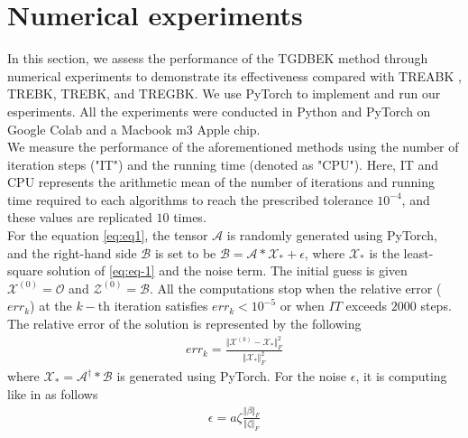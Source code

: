 \documentclass[11pt]{article}
\newtheorem{example}[theorem]{Example}
\def\fm#1{\mathcal{#1}}
\def\r{\mathbb{R}}
\def \x#1{\fm X^{(#1)}}
\begin{document}
\section{Numerical experiments} \label{sec:numexp}
In this section, we assess the  performance of  the TGDBEK method through numerical experiments to demonstrate its effectiveness compared with TREABK \cite{}, TREBK\cite{}, TREBK\cite{}, and TREGBK. We use  PyTorch \cite{} to implement and run our esperiments. All the experiments were conducted in Python and PyTorch on  Google Colab and a Macbook m3 Apple chip.\\
We measure the performance of the aforementioned methods using the number of iteration steps ("IT") and the running time (denoted as "CPU"). Here, IT and CPU represents the arithmetic mean of the number of iterations and running time required to  each algorithms to reach the prescribed tolerance $10^{-4}$, and these values are replicated $10$ times. \\

For the equation \eqref{eq:eq1}, the tensor $\fm A$ is randomly generated using PyTorch, and the right-hand side $\fm B$ is set to be $\fm B= \fm A * \fm X_\ast + \fm \epsilon$, where $\fm X_\ast$ is the least-square solution of \eqref{eq:eq-1} and the noise term.  The initial guess is given $\x{0} = \fm O$ and $\fm Z^{(0)}=\fm B$. All the  computations stop when the relative error ($err_k$) at the $k-$th iteration satisfies $err_k < 10^{-5}$ or when $IT$ exceeds $2000$ steps. The relative error of the solution is represented by the following
\begin{align*}
    err_k = \frac{\Vert \x{k}-\fm X_\ast \Vert_F^2}{\Vert \fm X_\ast \Vert_F^2}
\end{align*}
where $\fm X_\ast = \fm A^\dagger * \fm B$ is generated using PyTorch. For the noise $\epsilon$, it is computing like in \cite{huang2024TREK} as follows
\begin{align}
    \epsilon = a  \zeta  \frac{\Vert \beta\Vert_F} {\Vert \zeta \Vert_F}
\end{align}

\end{document}
